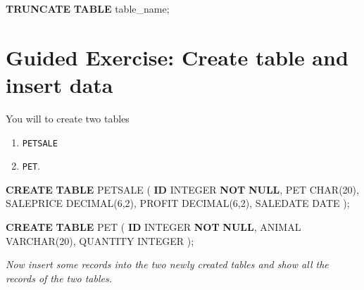 \documentclass[
]{book}
\newenvironment{Shaded}{\begin{snugshade}}{\end{snugshade}}
\newcommand{\DataTypeTok}[1]{\textcolor[rgb]{0.13,0.29,0.53}{#1}}
\newcommand{\DecValTok}[1]{\textcolor[rgb]{0.00,0.00,0.81}{#1}}
\newcommand{\KeywordTok}[1]{\textcolor[rgb]{0.13,0.29,0.53}{\textbf{#1}}}
\newcommand{\NormalTok}[1]{#1}
\begin{document}
\begin{Shaded}
\begin{Highlighting}[]
\KeywordTok{TRUNCATE} \KeywordTok{TABLE}\NormalTok{ table\_name;}
\end{Highlighting}
\end{Shaded}

\hypertarget{guided-exercise-create-table-and-insert-data}{%
\section{Guided Exercise: Create table and insert data}\label{guided-exercise-create-table-and-insert-data}}

You will to create two tables

\begin{enumerate}
\def\labelenumi{\arabic{enumi}.}
\item
  \texttt{PETSALE}
\item
  \texttt{PET}.
\end{enumerate}

\begin{Shaded}
\begin{Highlighting}[]
\KeywordTok{CREATE} \KeywordTok{TABLE}\NormalTok{ PETSALE (}
    \KeywordTok{ID} \DataTypeTok{INTEGER} \KeywordTok{NOT} \KeywordTok{NULL}\NormalTok{,}
\NormalTok{    PET }\DataTypeTok{CHAR}\NormalTok{(}\DecValTok{20}\NormalTok{),}
\NormalTok{    SALEPRICE }\DataTypeTok{DECIMAL}\NormalTok{(}\DecValTok{6}\NormalTok{,}\DecValTok{2}\NormalTok{),}
\NormalTok{    PROFIT }\DataTypeTok{DECIMAL}\NormalTok{(}\DecValTok{6}\NormalTok{,}\DecValTok{2}\NormalTok{),}
\NormalTok{    SALEDATE }\DataTypeTok{DATE}
\NormalTok{    );}
    
\KeywordTok{CREATE} \KeywordTok{TABLE}\NormalTok{ PET (}
    \KeywordTok{ID} \DataTypeTok{INTEGER} \KeywordTok{NOT} \KeywordTok{NULL}\NormalTok{,}
\NormalTok{    ANIMAL }\DataTypeTok{VARCHAR}\NormalTok{(}\DecValTok{20}\NormalTok{),}
\NormalTok{    QUANTITY }\DataTypeTok{INTEGER}
\NormalTok{    );}
\end{Highlighting}
\end{Shaded}

{\emph{Now insert some records into the two newly created tables and show all the records of the two tables. }}
\end{document}
